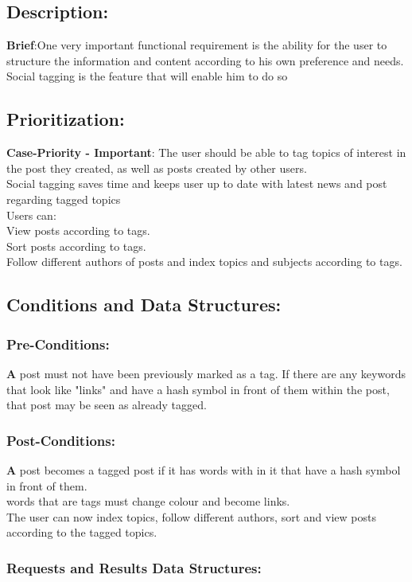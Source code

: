 \documentclass[a4paper,11pt]{article}
\begin{document}
\subsection*{Description:}
\textbf{Brief}:One very important functional requirement is the ability for the user to structure the information and content according to his own preference and needs. Social tagging is the feature that will enable him to do so
\subsection{Prioritization:} 
\textbf{Case-Priority - Important}: The user should be able to tag topics of interest in the post they created, as well
as posts created by other users.
\\Social tagging saves time and keeps user up to date with latest news and post regarding tagged topics
\\Users can: 
\\View posts according to tags.
\\Sort posts according to tags.
\\Follow different authors of posts and index topics and subjects according to tags.
\subsection{Conditions and Data Structures:}
\subsubsection*{Pre-Conditions:}
\textbf A post must not have been previously marked as a tag. If there are any keywords that look like "links" and have a hash symbol in front of them within the post, that post may be seen as already tagged.
\subsubsection*{Post-Conditions:}
\textbf A post becomes a tagged post if it has words with in it that have a hash symbol in front of them.
\\ words that are tags must change colour and become links.
\\The user can now index topics, follow different authors, sort and view posts according to the tagged topics.

\subsubsection*{Requests and Results Data Structures:}
\end{document}
